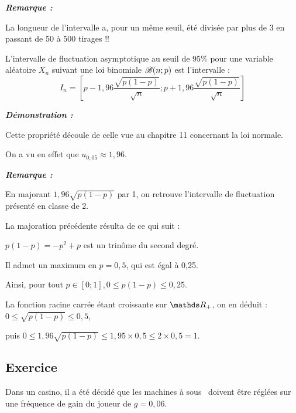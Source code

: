 \documentclass[12pt,french]{book}
\begin{document}
\begin{spacing}{1.2}
\medskip

\textbf{\textit{Remarque :}}

La longueur de l'intervalle a, pour un même seuil, été divisée par plus de 3 en passant de 50 à 500 tirages \quad !!

\medskip

\begin{propr}

L'intervalle de fluctuation asymptotique au seuil de 95\% pour une variable aléatoire $X_n$ suivant une loi binomiale $\mathscr{B}(n;p)$ est l'intervalle :
\[I_n=\left[p-1,96\frac{\sqrt{p(1-p)}}{\sqrt{n}};p+1,96\frac{\sqrt{p(1-p)}}{\sqrt{n}}\right]\]

\end{propr}

\bigskip

\textbf{\textit{Démonstration :}}

Cette propriété découle de celle vue au chapitre 11 concernant la loi normale.

On a vu en effet que $u_{0,05}\approx 1,96$.

\medskip

\textbf{\textit{Remarque :}}

En majorant $1,96\sqrt{p(1-p)}$ par 1, on retrouve l'intervalle de fluctuation présenté en classe de 2.

La majoration précédente résulta de ce qui suit :

$p(1-p)=-p^2+p$ est un trinôme du second degré.

Il admet un maximum en $p=0,5$, qui est égal à 0,25.

Ainsi, pour tout $p\in [0;1], 0\leq p(1-p)\leq 0,25$.

La fonction racine carrée étant croissante sur $\R_+$, on en déduit : $0\leq \sqrt{p(1-p)}\leq 0,5$, 

puis $0\leq 1,96\sqrt{p(1-p)}\leq 1,95\times 0,5\leq 2\times 0,5=1$.

\subsection{Exercice}

\begin{defi}

Dans un casino, il a été décidé que les \og machines à sous\fg~ doivent être réglées sur une fréquence de gain du joueur de $g=0,06$.


\end{defi}
\end{spacing}
\end{document}
